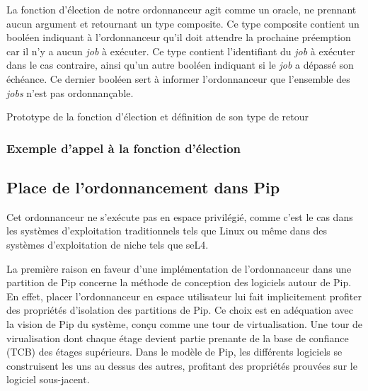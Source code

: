 		La fonction d'élection de notre ordonnanceur agit comme un oracle, ne prennant aucun argument et retournant un type composite. Ce type composite contient un booléen indiquant à l'ordonnanceur qu'il doit attendre la prochaine préemption car il n'y a aucun \emph{job} à exécuter. Ce type contient l'identifiant du \emph{job} à exécuter dans le cas contraire, ainsi qu'un autre booléen indiquant si le \emph{job} a dépassé son échéance. Ce dernier booléen sert à informer l'ordonnanceur que l'ensemble des \emph{jobs} n'est pas ordonnançable. 

		\begin{listing}[!ht]
			\caption{Prototype de la fonction d'élection et définition de son type de retour }
		\end{listing}

			\subsubsection{Exemple d'appel à la fonction d'élection}

			\begin{figure}[!ht]
			\end{figure}

			\begin{figure}[!ht]
			\end{figure}

		\subsection{Place de l'ordonnancement dans Pip}

		Cet ordonnanceur ne s'exécute pas en espace privilégié, comme c'est le cas dans les systèmes d'exploitation traditionnels tels que Linux ou même dans des systèmes d'exploitation de niche tels que seL4. 

		La première raison en faveur d'une implémentation de l'ordonnanceur dans une partition de Pip concerne la méthode de conception des logiciels autour de Pip. En effet, placer l'ordonnanceur en espace utilisateur lui fait implicitement profiter des propriétés d'isolation des partitions de Pip. Ce choix est en adéquation avec la vision de Pip du système, conçu comme une tour de virtualisation. Une tour de virualisation dont chaque étage devient partie prenante de la base de confiance (TCB) des étages supérieurs. Dans le modèle de Pip, les différents logiciels se construisent les uns au dessus des autres, profitant des propriétés prouvées sur le logiciel sous-jacent.

